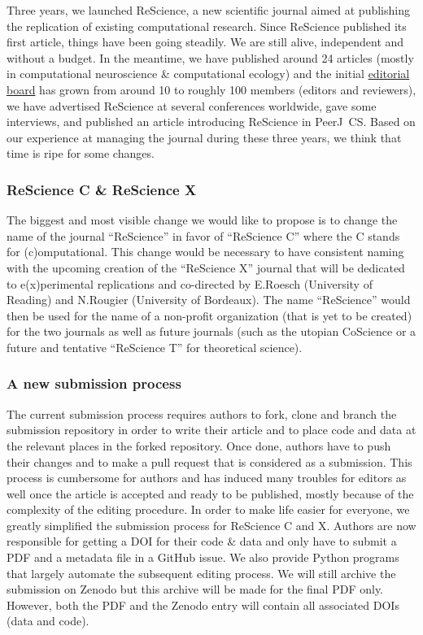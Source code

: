 
Three years, we launched ReScience, a new scientific journal aimed at publishing the
replication of existing computational research. Since ReScience published its first
article\supercite{Topalidou:2015}, things have been
going steadily. We are still alive, independent and without a budget. In the
meantime, we have published around 24 articles (mostly in computational
neuroscience \& computational ecology) and the initial
\href{https://rescience-c.github.io/board/}{editorial board} has grown from
around 10 to roughly 100 members (editors and reviewers), we have advertised
ReScience at several conferences worldwide, gave some
interviews\supercite{Science:2018}, and published an article introducing
ReScience in PeerJ~CS\supercite{Rougier:2017}. Based on our
experience\supercite{Rougier:2018} at managing the journal during these three
years, we think that time is ripe for some changes.

\subsubsection{ReScience C \& ReScience X}

The biggest and most visible change we would like to propose is to change the
name of the journal ``ReScience'' in favor of ``ReScience C'' where the C
stands for (c)omputational. This change would be necessary to have consistent
naming with the upcoming creation of the ``ReScience X'' journal that will be
dedicated to e(x)perimental replications and co-directed by E.Roesch
(University of Reading) and N.Rougier (University of Bordeaux). The name
``ReScience'' would then be used for the name of a non-profit organization
(that is yet to be created) for the two journals as well as future journals
(such as the utopian CoScience\supercite{Rougier:2017} or a future and
tentative ``ReScience T'' for theoretical science).


\subsubsection{A new submission process}

The current submission process requires authors to fork, clone and branch the
submission repository in order to write their article and to place code and
data at the relevant places in the forked repository. Once done, authors have
to push their changes and to make a pull request that is considered as a
submission. This process is cumbersome for authors and has induced many
troubles for editors as well once the article is accepted and ready to be
published, mostly because of the complexity of the editing procedure. In order
to make life easier for everyone, we greatly simplified the submission process
for ReScience C and X. Authors are now responsible for getting a DOI for their
code \& data and only have to submit a PDF and a metadata file in a GitHub
issue.
We also provide Python programs that largely automate the subsequent editing
process. We will still archive the submission on Zenodo but this archive will
be made for the final PDF only. However, both the PDF and the Zenodo entry will
contain all associated DOIs (data and code).


